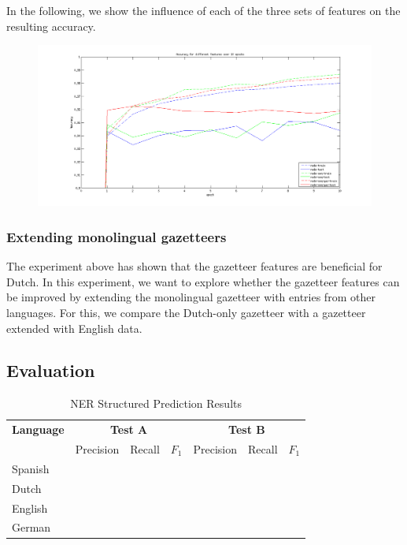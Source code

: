 \documentclass[11pt]{article}
\begin{document}
In the following, we show the influence of each of the three sets of features on the resulting accuracy.
\FloatBarrier
\begin{figure}[t!]
\centering
 \includegraphics[scale=0.5]{Plot.png}
\end{figure}


\subsubsection{Extending monolingual gazetteers}

The experiment above has shown that the gazetteer features are beneficial for Dutch. In this experiment, we want to explore whether the gazetteer features can be improved by extending the monolingual gazetteer with entries from other languages. For this, we compare the Dutch-only gazetteer with a gazetteer extended with English data.



\subsection{Evaluation}

\begin{table}[t]
\centering
\begin{tabular}{| l | l l l| l l l |}

\hline
\bf Language & \multicolumn{3}{c|}{ \bf Test A}&\multicolumn{3}{c|}{ \bf Test B}\\
             & Precision & Recall & $F_1$ & Precision & Recall & $F_1$ \\ \hline
Spanish &       &          &     &          &               & \\
Dutch  &         &          &     &          &               &   \\
English &        &          &     &          &               &       \\
German &      &          &       &          &             & \\
\hline
\end{tabular}
\caption{NER Structured Prediction Results }
\label{table:Results}
\end{table}
\end{document}
